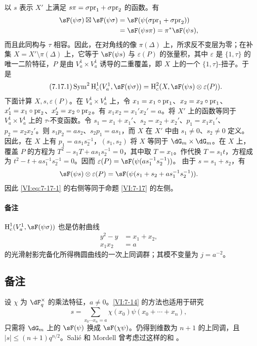 以 $s$ 表示 $X'$ 上满足 $s\pi=\sigma\mathrm{pr}_1+\sigma\mathrm{pr}_2$ 的函数。有
\begin{align*}
\sF(\psi\sigma)\boxtimes\sF(\psi\sigma)
&=\sF(\psi(\sigma\pr_1+\sigma\pr_2))\\
&=\sF(\psi s\pi)=\pi^\ast\sF(\psi s),
\end{align*}
而且此同构与 $\tau$ 相容。因此，在对角线的像 $\pi(\Delta)$ 上，所求反不变层为零；在补集 $X=X'\setminus\pi(\Delta)$ 上，它等于 $\sF(\psi s)$ 与 $\varepsilon(P)$ 的张量积，其中 $\varepsilon$ 是 $\{1,\tau\}$ 的唯一二阶特征，$P$ 是由 $V_a^1\times V_a^1$ 诱导的二重覆盖，即 $X$ 上的一个 $\{1,\tau\}$-扭子。于是
\begin{equation*}\tag{7.17.1}\label{VI:eq:7-17-1}
\operatorname{Sym}^2\h_c^1(V_a^1,\sF(\psi\sigma))
=\h_c^2(X,\sF(\psi s)\otimes\varepsilon(P)).
\end{equation*}
下面计算 $X,s,\varepsilon(P)$。在 $V_a^1\times V_a^1$ 上，令
$x_1=x_1\circ\mathrm{pr}_1$、$x_2=x_2\circ\mathrm{pr}_1$、$x_1'=x_1\circ\mathrm{pr}_2$、$x_2'=x_2\circ\mathrm{pr}_2$。有 $x_1x_2=x_1'x_2'=a$。将 $X'$ 上的函数等同于 $V_a^1\times V_a^1$ 上的 $\tau$-不变函数。令
$s_1=x_1+x_1'$、$s_2=x_2+x_2'$、$p_1=x_1x_1'$、$p_2=x_2x_2'$。则
$s_1p_2=as_2$、$s_2p_1=as_1$，而 $X$ 在 $X'$ 中由 $s_1\ne0$、$s_2\ne0$ 定义。因此，在 $X$ 上有 $p_1=as_1s_2^{-1}$，$(s_1,s_2)$ 将 $X$ 等同于 $\dG_m\times\dG_m$。在 $X$ 上，覆盖 $P$ 的方程为
$T^2-s_1T+as_1s_2^{-1}=0$，其中取 $T=x_1$。作代换 $T=s_1t$，方程成为
$t^2-t+as_1^{-1}s_2^{-1}=0$。因而
$\varepsilon(P)=\sF(\psi(as_1^{-1}s_2^{-1}))$。
由于 $s=s_1+s_2$，有
\[\sF(\psi s)\otimes\varepsilon(P)
=\sF(\psi(s_1+s_2+as_1^{-1}s_2^{-1})).\]
因此 \eqref{VI:eq:7-17-1} 的右侧等同于命题 \ref{VI:7-17} 的左侧。

\paragraph{备注}
$\h_c^1(V_a^1,\sF(\psi\sigma))$ 也是仿射曲线
\begin{align*}
y^2-y&=x_1+x_2,\\x_1x_2&=a
\end{align*}
的光滑射影完备化所得椭圆曲线的一次上同调群；其模不变量为 $j=a^{-2}$。

\subsection{备注}\label{VI:7-18}
设 $\chi$ 为 $\dF_q^\times$ 的乘法特征，$a\ne0$。\ref{VI:7-14} 的方法也适用于研究
\[s=\sum_{x_0\cdots x_n=a}\chi(x_0)\psi(x_0+\cdots+x_n),\]
只需将 $\dG_m$ 上的 $\sF(\psi)$ 换成 $\sF(\chi\psi)$。仍得到维数为 $n+1$ 的上同调，且 $|s|\le(n+1)q^{n/2}$。Salié 和 Mordell 曾考虑过这样的和 \cite{mo73}。


